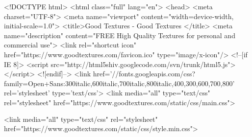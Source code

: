 <!DOCTYPE html>
<html class="full" lang="en">
<head>
    <meta charset="UTF-8">
    <meta name="viewport" content="width=device-width, initial-scale=1.0">
    <title>Good Textures  - Good Textures </title>
    <meta name="description" content="FREE High Quality Textures for personal and commercial use">
    <link rel="shortcut icon" href="https://www.goodtextures.com/favicon.ico" type="image/x-icon"/>
    <!--[if IE 8]>
    <script src="http://html5shiv.googlecode.com/svn/trunk/html5.js"></script>
    <![endif]-->
    <link href='//fonts.googleapis.com/css?family=Open+Sans:300italic,600italic,700italic,800italic,400,300,600,700,800' rel='stylesheet' type='text/css'>
    <link media="all" type="text/css" rel="stylesheet" href="https://www.goodtextures.com/static/css/main.css">

    <link media="all" type="text/css" rel="stylesheet" href="https://www.goodtextures.com/static/css/style.min.css">


